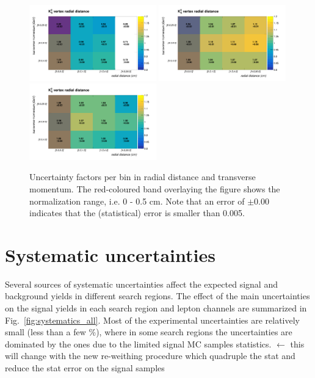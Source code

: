 \begin{figure}[h]
	\centering	
	\includegraphics[width=0.49\textwidth]{Figures/c6/efficiencies/2dplots/2016tot/smallrange}
	\includegraphics[width=0.49\textwidth]{Figures/c6/efficiencies/2dplots/2017tot/smallrange}
	\\
	\includegraphics[width=0.49\textwidth]{Figures/c6/efficiencies/2dplots/2018tot/smallrange}
	\caption{Uncertainty factors per bin in radial distance and transverse momentum. The red-coloured band overlaying the figure shows the normalization range, i.e. 0 - 0.5 cm. Note that an error of $\pm 0.00$ indicates that the (statistical) error is smaller than 0.005.}
	\label{fig:2dplots}
\end{figure}

\section{Systematic uncertainties}\label{sec:llsystematic}
Several sources of systematic uncertainties affect the expected signal
and background yields in different search regions. 
The effect of the main uncertainties on the signal yields in each
search region and lepton channels are summarized in
Fig.~\ref{fig:systematics_all}. 
Most of the experimental uncertainties are relatively small (less than
a few \%), where in some search regions the uncertainties are
dominated by the ones due to the limited signal MC samples statistics. 
{\color{red}
  $\leftarrow$ this
  will change with the new re-weithing procedure which quadruple the
  stat and reduce the stat error on the signal samples}

